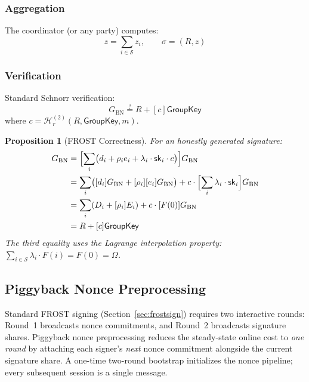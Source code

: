 \documentclass[11pt,a4paper]{article}
\newtheorem{proposition}[theorem]{Proposition}
\newcommand{\genbn}{G_{\mathrm{BN}}}
\newcommand{\hash}{\mathcal{H}}
\begin{document}
\subsubsection{Aggregation}

The coordinator (or any party) computes:
\begin{equation}
  z = \sum_{i \in \mathcal{S}} z_i, \qquad \sigma = (R, z)
  \label{eq:aggregate}
\end{equation}

\subsubsection{Verification}

Standard Schnorr verification:
\begin{equation}
  [z]\genbn \stackrel{?}{=} R + [c]\mathsf{GroupKey}
  \label{eq:verify-sig}
\end{equation}
where $c = \hash_r^{(2)}(R, \mathsf{GroupKey}, m)$.

\begin{proposition}[FROST Correctness]
  For an honestly generated signature:
  \begin{align}
    [z]\genbn
    &= \Bigl[\sum_{i} \bigl(d_i + \rho_i e_i + \lambda_i \cdot \mathsf{sk}_i \cdot c\bigr)\Bigr]\genbn \\
    &= \sum_{i} \bigl([d_i]\genbn + [\rho_i][e_i]\genbn\bigr)
      + c \cdot \Bigl[\sum_{i} \lambda_i \cdot \mathsf{sk}_i\Bigr]\genbn \\
    &= \sum_{i} (D_i + [\rho_i]E_i) + c \cdot [F(0)]\genbn \\
    &= R + [c]\mathsf{GroupKey}
  \end{align}
  The third equality uses the Lagrange interpolation property:
  $\sum_{i \in \mathcal{S}} \lambda_i \cdot F(i) = F(0) = \Omega$.
\end{proposition}

\subsection{Piggyback Nonce Preprocessing}
\label{sec:piggyback}

Standard FROST signing (Section~\ref{sec:frostsign}) requires two interactive
rounds: Round~1 broadcasts nonce commitments, and Round~2 broadcasts signature
shares.  Piggyback nonce preprocessing reduces the steady-state online cost to
\emph{one round} by attaching each signer's \emph{next} nonce commitment
alongside the current signature share.  A one-time two-round bootstrap
initializes the nonce pipeline; every subsequent session is a single message.
\end{document}
